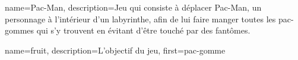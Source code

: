 
{
  name={Pac-Man},
  description={Jeu qui consiste à déplacer Pac-Man, un personnage à l'intérieur d'un labyrinthe, afin de lui faire manger toutes les pac-gommes qui s'y trouvent en évitant d’être touché par des fantômes.}
}

{
	name={fruit},
	description={L'objectif du jeu},
	first={pac-gomme}
}


